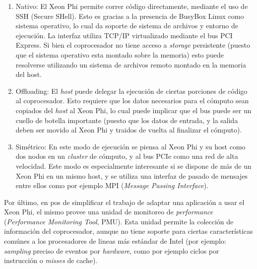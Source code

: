 \begin{enumerate}
    \item Nativo: El Xeon Phi permite correr c\'odigo directamente, mediante el uso de SSH (Secure SHell). Esto es gracias a la presencia de BusyBox Linux como sistema operativo,
    lo cual da soporte de sistema de archivos y entorno de ejecuci\'on. La interfaz utiliza TCP/IP virtualizado mediante el bus PCI Express. Si bien el coprocesador no tiene acceso a \textit{storage} persistente (puesto que el sistema operativo esta montado sobre la memoria) esto puede resolverse utilizando un sistema de archivos remoto montado en la memoria del host.
    \item Offloading: El \textit{host} puede delegar la ejecuci\'on de ciertas porciones de c\'odigo al coprocesador. Esto requiere que los datos necesarios para el c\'omputo sean copiados del \textit{host} al Xeon Phi, lo cual puede implicar que el bus puede ser un cuello de botella importante (puesto que los datos de entrada, y la salida deben ser movido al Xeon Phi y traidos de vuelta al finalizar el c\'omputo).
    \item Simétrico: En este modo de ejecuci\'on se piensa al Xeon Phi y su host como dos nodos en un \textit{cluster} de c\'omputo, y al bus PCIe como una red de alta velocidad.
Este modo es especialmente interesante si se dispone de m\'as de un Xeon Phi en un mismo host, y se utiliza una interfaz de pasado de mensajes entre ellos como por ejemplo MPI (\textit{Message Passing Interface}).
\end{enumerate}

Por \'ultimo, en pos de simplificar el trabajo de adaptar una aplicaci\'on a usar el Xeon Phi, el mismo provee una unidad de monitoreo de \textit{performance} (\textit{Performance
Monitoring Tool}, PMU). Esta unidad permite la colecci\'on de informaci\'on del coprocesador, aunque no tiene soporte para ciertas caracter\'isticas com\'unes a los procesadores
de lineas m\'as est\'andar de Intel (por ejemplo: \textit{sampling} preciso de eventos por \textit{hardware}, como por ejemplo ciclos por instrucci\'on o \textit{misses} de cache).
